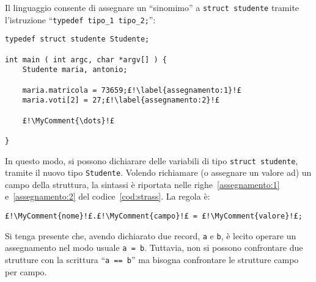 Il linguaggio  consente di assegnare un ``sinomimo'' a \lstinline!struct studente! tramite l'istruzione ``\lstinline!typedef tipo_1 tipo_2;!'':
\begin{lstlisting}[caption={\em \lstinline!typedef! e assegnamenti.}, label={cod:strass}]
typedef struct studente Studente;

int main ( int argc, char *argv[] ) {
	Studente maria, antonio;

	maria.matricola = 73659;£!\label{assegnamento:1}!£
	maria.voti[2] = 27;£!\label{assegnamento:2}!£

	£!\MyComment{\dots}!£

}
\end{lstlisting}
In questo modo, si possono dichiarare delle variabili di tipo \lstinline!struct studente!, tramite il nuovo tipo \lstinline!Studente!.
Volendo richiamare (o assegnare un valore ad) un campo della struttura, la sintassi è riportata nelle righe~\ref{assegnamento:1} e~\ref{assegnamento:2} del codice~\ref{cod:strass}.
La regola è:
\begin{lstlisting}
£!\MyComment{nome}!£.£!\MyComment{campo}!£ = £!\MyComment{valore}!£;
\end{lstlisting}


Si tenga presente che, avendo dichiarato due record, \lstinline!a! e \lstinline!b!, è lecito operare un assegnamento nel modo usuale \lstinline!a = b!.
Tuttavia, non si possono confrontare due strutture con la scrittura ``\lstinline!a == b!'' ma bisogna confrontare le strutture campo per campo.

